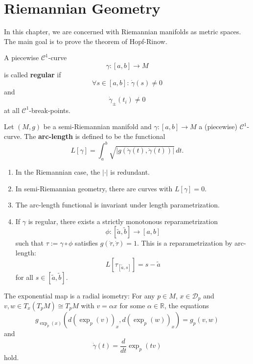 \chapter{Riemannian Geometry}
In this chapter, we are concerned with Riemannian manifolds as metric spaces. The main goal is to prove the theorem of Hopf-Rinow.
\begin{definition}
   A piecewise $\mathcal{C}^1$-curve \[
       \gamma: [a,b] \to M
   \] is called \textbf{regular} if 
   \[
       \forall s \in [a,b]:\, \dot{\gamma}(s)\neq 0
   \] and \[
   \dot{\gamma}_{\pm}(t_i) \neq 0
   \] at all $\mathcal{C}^1$-break-points.
\end{definition} 
\begin{definition}
    Let $(M,g)$ be a semi-Riemannian manifold and $\gamma: [a,b]\to M$ a (piecewise) $\mathcal{C}^1$-curve. The \textbf{arc-length} is defined to be the functional
    \[
        L[\gamma] = \int_a^b \sqrt{| g(\dot{\gamma}(t), \dot{\gamma}(t))|} \, dt
    .\] 
\end{definition}
\begin{remark}
   \begin{enumerate}
      \item In the Riemannian case, the $| \cdot |$ is redundant.
        \item In semi-Riemannian geometry, there are curves with $L[\gamma]=0$.
        \item The arc-length functional is invariant under length parametrization.
        \item If $\gamma$ is regular, there exists a strictly monotonous reparametrization \[
            \phi: [\tilde{a}, \tilde{b}] \to [a,b] \] such that $\tau := \gamma \circ \phi$ satisfies $g(\dot{\tau}, \dot{\tau})=1$. This is a reparametrization by arc-length: \[
            L[\tau_{[\tilde{a},s]}]=s-\tilde{a}
        \] for all $s \in [\tilde{a}, \tilde{b}]$.
   \end{enumerate} 
\end{remark}

\begin{theorem}
   The exponential map is a radial isometry: For any $p \in M$, $x \in \mathcal{D}_p$ and $v,w \in T_x(T_pM) \cong T_pM$ with $v = \alpha x$ for some $\alpha \in \mathbb{R}$, the equations \[
       g_{\exp_p(x)}(d(\exp_p(v))_x, d(\exp_p(w))_x)=g_p(v,w)
   \]  and \[
   \dot{\gamma}(t)=\frac{d}{dt}\exp_p(tv)
   \] hold.
\end{theorem}

